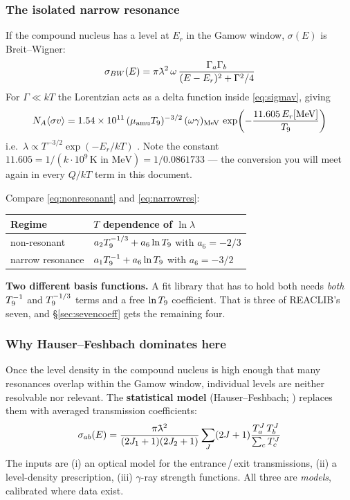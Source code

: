 \subsubsection{The isolated narrow resonance}
\label{sec:narrowres}

If the compound nucleus has a level at $E_r$ in the Gamow window, $\sigma(E)$ is
Breit--Wigner:
%
\begin{equation*}
\sigma_{BW}(E) = \pi\lbar^2\,\omega\,
\frac{\Gamma_a \Gamma_b}{(E-E_r)^2 + \Gamma^2/4}
\end{equation*}
%
For $\Gamma \ll kT$ the Lorentzian acts as a delta function inside
\eqref{eq:sigmav}, giving
%
\begin{equation}
N_{A}\langle\sigma v\rangle
= 1.54\times10^{11}\,(\mu_{\rm amu} T_{9})^{-3/2}\,(\omega\gamma)_{\rm MeV}\,
  \exp\!\left(-\frac{11.605\,E_r[\text{MeV}]}{T_{9}}\right)
\label{eq:narrowres}
\end{equation}
%
i.e.\ $\lambda \propto T^{-3/2}\exp(-E_r/kT)$ \citep{longland2010}. Note the
constant $11.605 = 1/(k\cdot10^9\,\text{K in MeV}) = 1/0.0861733$ --- the
conversion you will meet again in every $Q/kT$ term in this document.

Compare \eqref{eq:nonresonant} and \eqref{eq:narrowres}:

\begin{center}
\begin{tabularx}{\textwidth}{@{}L{4cm} Y@{}}
\toprule
\textbf{Regime} & \textbf{$T$ dependence of $\ln\lambda$} \\
\midrule
non-resonant & $a_2 T_{9}^{-1/3} + a_6\ln T_{9}$ with $a_6 = -2/3$ \\
narrow resonance & $a_1 T_{9}^{-1} + a_6\ln T_{9}$ with $a_6 = -3/2$ \\
\bottomrule
\end{tabularx}
\end{center}

\textbf{Two different basis functions.} A fit library that has to hold both
needs \emph{both} $T_{9}^{-1}$ and $T_{9}^{-1/3}$ terms and a free $\ln T_{9}$
coefficient. That is three of REACLIB's seven, and \S\ref{sec:sevencoeff} gets
the remaining four.

\subsubsection{Why Hauser--Feshbach dominates here}
\label{sec:hf-dominates}

Once the level density in the compound nucleus is high enough that many
resonances overlap within the Gamow window, individual levels are neither
resolvable nor relevant. The \textbf{statistical model} (Hauser--Feshbach;
\citealp{rauscher2000}) replaces them with averaged transmission coefficients:
%
\begin{equation*}
\sigma_{ab}(E) = \frac{\pi\lbar^2}{(2J_1+1)(2J_2+1)}
\sum_J (2J+1)\frac{T_a^J\,T_b^J}{\sum_c T_c^J}
\end{equation*}
%
The inputs are (i) an optical model for the entrance\,/\,exit transmissions,
(ii) a level-density prescription, (iii) $\gamma$-ray strength functions. All
three are \emph{models}, calibrated where data exist.

